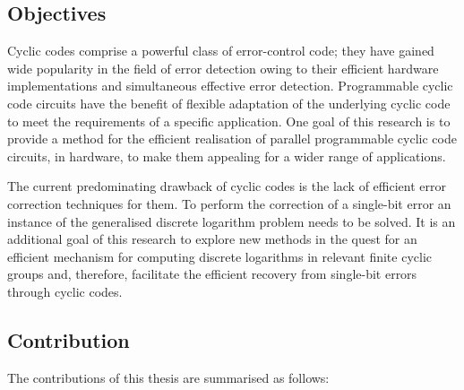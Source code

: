 \documentclass[a4paper, 11pt]{article}
\begin{document}
\subsection{Objectives}
Cyclic codes comprise a powerful class of error-control code; they have gained wide popularity in the field of error detection owing to their efficient hardware implementations and simultaneous effective error detection. Programmable cyclic code circuits have the benefit of flexible adaptation of the underlying cyclic code to meet the requirements of a specific application. One goal of this research is to provide a method for the efficient realisation of parallel programmable cyclic code circuits, in hardware, to make them appealing for a wider range of applications.

The current predominating drawback of cyclic codes is the lack of efficient error correction techniques for them. To perform the correction of a single-bit error an instance of the generalised discrete logarithm problem needs to be solved. It is an additional goal of this research to explore new methods in the quest for an efficient mechanism for computing discrete logarithms in relevant finite cyclic groups and, therefore, facilitate the efficient recovery from single-bit errors through cyclic codes.

\subsection{Contribution}
The contributions of this thesis are summarised as follows:
\end{document}

